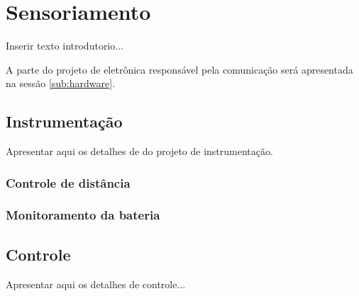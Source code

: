 \section{Sensoriamento} %
\label{sec:sensoriamento2}

	Inserir texto introdutorio...

	A parte do projeto de eletrônica responsável pela comunicação será apresentada na sessão \ref{sub:hardware}.

	\subsection{Instrumentação} %
	\label{sub:instrumentação2}

		Apresentar aqui os detalhes de do projeto de instrumentação.

		\subsubsection{Controle de distância}

		\subsubsection{Monitoramento da bateria}
		

	\subsection{Controle} %
	\label{sub:controle2}
		
		Apresentar aqui os detalhes de controle...
